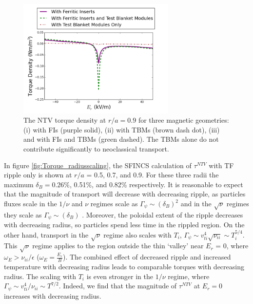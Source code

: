 \documentclass{article}
\numberwithin{figure}{section}
\numberwithin{equation}{section}
\begin{document}
\begin{figure}[h!]
\centering
\includegraphics[width=0.7\textwidth]{Torque_comparingTBMandFI.png}
\caption{\label{fig:Torque_comparingTBMandFI} The NTV torque density at $r/a = 0.9$ for three magnetic geometries: (i) with FIs (purple solid), (ii) with TBMs (brown dash dot), (iii) and with FIs and TBMs (green dashed). The TBMs alone do not contribute significantly to neoclassical transport. }
\end{figure}

In figure \ref{fig:Torque_radiusscaling}, the SFINCS calculation of $\tau^{NTV}$ with TF ripple only is shown at $r/a$ = 0.5, 0.7, and 0.9. For these three radii the maximum $\delta_B = 0.26\%$,  0.51\%, and 0.82\% respectively. It is reasonable to expect that the magnitude of transport will decrease with decreasing ripple, as particles fluxes scale in the $1/\nu$ and $\nu$ regimes scale as $\Gamma_{\psi} \sim (\delta_B)^2$ and in the $\sqrt{\nu}$ regimes they scale as $ \Gamma_{\psi}\sim (\delta_B)$ \cite{Shaing2010}.  Moreover, the poloidal extent of the ripple decreases with decreasing radius, so particles spend less time in the rippled region. On the other hand, transport in the $\sqrt{\nu}$ regime also scales with $T_i$, $\Gamma_{\psi} \sim v_{ti}^4 \sqrt{\nu_{ii}} \sim T_i^{5/4}$. This $\sqrt{\nu}$ regime applies to the region outside the thin `valley' near $E_r$ = 0, where $\omega_E > \nu_{ii}/\epsilon$ ($\omega_E = \frac{E_r}{B}$). The combined effect of decreased ripple and increased temperature with decreasing radius leads to comparable torques with decreasing radius. The scaling with $T_i$ is even stronger in the $1/\nu$ regime, where $\Gamma_{\psi} \sim v_{ti}^4/\nu_{ii} \sim T^{7/2}$. Indeed, we find that the magnitude of $\tau^{NTV}$ at $E_r = 0$ increases with decreasing radius. 
\end{document}
